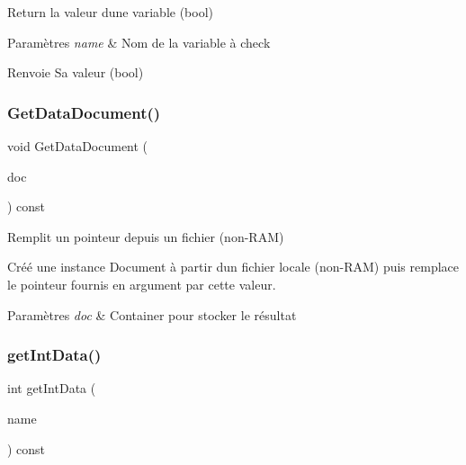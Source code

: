 Return la valeur d\textquotesingle{}une variable (bool) 


\begin{DoxyParams}{Paramètres}
{\em name} & Nom de la variable à check \\
\hline
\end{DoxyParams}
\begin{DoxyReturn}{Renvoie}
Sa valeur (bool) 
\end{DoxyReturn}
\mbox{\label{classDataManager_a0539555de38fb7fbfa170007a0cb3ae3}} 
\subsubsection{\texorpdfstring{Get\+Data\+Document()}{GetDataDocument()}}
{\footnotesize\ttfamily void Get\+Data\+Document (\begin{DoxyParamCaption}\item[{Document $\ast$}]{doc }\end{DoxyParamCaption}) const\hspace{0.3cm}{\ttfamily [inline]}}



Remplit un pointeur depuis un fichier (non-\/\+R\+AM) 

Créé une instance Document à partir d\textquotesingle{}un fichier locale (non-\/\+R\+AM) puis remplace le pointeur fournis en argument par cette valeur. 
\begin{DoxyParams}{Paramètres}
{\em doc} & Container pour stocker le résultat \\
\hline
\end{DoxyParams}
\mbox{\label{classDataManager_af0c4f956eace0565b8909cdd21933da1}} 
\subsubsection{\texorpdfstring{get\+Int\+Data()}{getIntData()}}
{\footnotesize\ttfamily int get\+Int\+Data (\begin{DoxyParamCaption}\item[{const Q\+String}]{name }\end{DoxyParamCaption}) const\hspace{0.3cm}{\ttfamily [inline]}}



